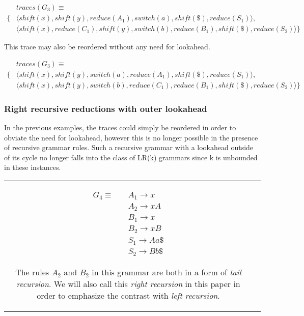 \documentclass[11pt]{article}
\begin{document}
\parbox{.3\textwidth}{\begin{align*}
&traces(G_3) \equiv \\
\{ & \langle shift(x), shift(y), reduce(A_1), switch(a), shift(\$), reduce(S_1) \rangle,\\
   & \langle shift(x), reduce(C_1), shift(y), switch(b), reduce(B_1), shift(\$), reduce(S_2) \rangle \}
\end{align*}}

This trace may also be reordered without any need for lookahead.

\parbox{.3\textwidth}{\begin{align*}
&traces(G_3) \equiv \\
\{ & \langle shift(x), shift(y), switch(a), reduce(A_1), shift(\$), reduce(S_1) \rangle,\\
   & \langle shift(x), shift(y), switch(b), reduce(C_1), reduce(B_1), shift(\$), reduce(S_2) \rangle \}
\end{align*}}

\subsubsection{Right recursive reductions with outer lookahead}
In the previous examples, the traces could simply be reordered in order to obviate the need for lookahead, however this is no longer possible in the presence of recursive grammar rules.
Such a recursive grammar with a lookahead outside of its cycle no longer falls into the class of LR(k) grammars since k is unbounded in these instances.

\begin{tabular}[t]{cl}
\parbox{.3\textwidth}{
\begin{align*}
G_4 \equiv \quad & A_1 \rightarrow x\\
                 & A_2 \rightarrow x A\\
                 & B_1 \rightarrow x\\
                 & B_2 \rightarrow x B\\
                 & S_1 \rightarrow A a \$\\
                 & S_2 \rightarrow B b \$
\end{align*}}
\parbox{.8\textwidth}{The rules $A_2$ and $B_2$ in this grammar are both in a form of \emph{tail recursion}. 
We will also call this \emph{right recursion} in this paper in order to emphasize the contrast with \emph{left recursion}.}
\end{tabular}
\end{document}
